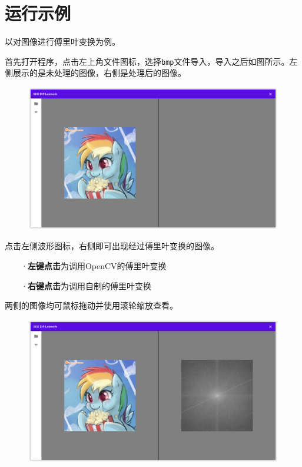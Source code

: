 \documentclass{article}
\begin{document}
\section{运行示例}

以对图像进行傅里叶变换为例。

首先打开程序，点击左上角文件图标，选择\texttt{bmp}文件导入，导入之后如图所示。左侧展示的是未处理的图像，右侧是处理后的图像。

\begin{figure}[H]
    \includegraphics[width=\textwidth]{img/usage-1.png}
\end{figure}

点击左侧波形图标，右侧即可出现经过傅里叶变换的图像。

~~~~·\textbf{左键点击}为调用OpenCV的傅里叶变换

~~~~·\textbf{右键点击}为调用自制的傅里叶变换

两侧的图像均可鼠标拖动并使用滚轮缩放查看。

\begin{figure}[H]
    \includegraphics[width=\textwidth]{img/usage-2.png}
\end{figure}
\end{document}
